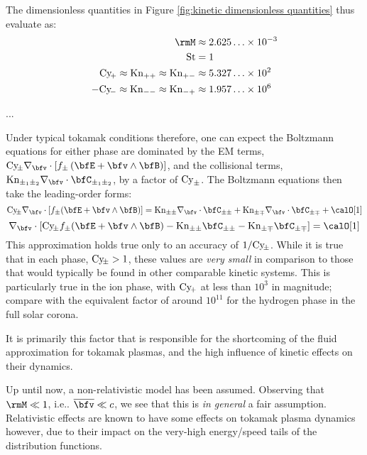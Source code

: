     The dimensionless quantities in Figure \ref{fig:kinetic dimensionless quantities} thus evaluate as:
    \begin{align}
                                                           \rmM  &\approx  2.625\ldots\times 10^{- 3}  \\
                                                          \rmSt  &=        1                           \\
          \rmCy\!_{+}  \approx  \rmKn_{++}  \approx  \rmKn_{+-}  &\approx  5.327\ldots\times 10^{2}    \\
        - \rmCy\!_{-}  \approx  \rmKn_{--}  \approx  \rmKn_{-+}  &\approx  1.957\ldots\times 10^{6}
    \end{align}

    ...

    Under typical tokamak conditions therefore, one can expect the Boltzmann equations for either phase are dominated by the EM terms, $\rmCy\!_{\pm}\nabla_{\bfv}\cdot[f_{\pm}\left(\bfE + \bfv\wedge\bfB\right)]$, and the collisional terms, $\rmKn_{\pm_{1}\pm_{2}}\nabla_{\bfv}\cdot\bfC_{\pm_{1}\pm_{2}}$, by a factor of $\mathrm{Cy}_{\pm}$. The Boltzmann equations then take the leading-order forms:
    \begin{equation}
        \rmCy\!_{\pm}\nabla_{\bfv}\cdot[f_{\pm}(\bfE + \bfv\wedge\bfB)]  =  \rmKn_{\pm\pm}\nabla_{\bfv}\cdot\bfC_{\pm\pm} + \rmKn_{\pm\mp}\nabla_{\bfv}\cdot\bfC_{\pm\mp} + \calO[1]
    \end{equation}
    \begin{equation}
        \nabla_{\bfv}\cdot[\rmCy\!_{\pm}f_{\pm}(\bfE + \bfv\wedge\bfB) - \rmKn_{\pm\pm}\bfC_{\pm\pm} - \rmKn_{\pm\mp}\bfC_{\pm\mp}]  =  \calO[1]  \label{eqn:leading-order Boltzmann equation}
    \end{equation}
    This approximation holds true only to an accuracy of $1/\mathrm{Cy}\!_{\pm}$. While it is true that in each phase, $\mathrm{Cy}\!_{\pm} > 1$, these values are \emph{very small} in comparison to those that would typically be found in other comparable kinetic systems. This is particularly true in the ion phase, with $\mathrm{Cy}\!_{+}$ at less than $10^{3}$ in magnitude; compare with the equivalent factor of around $10^{11}$ for the hydrogen phase in the full solar corona.

    It is primarily this factor that is responsible for the shortcoming of the fluid approximation for tokamak plasmas, and the high influence of kinetic effects on their dynamics.

    \begin{remark}
        Up until now, a non-relativistic model has been assumed. Observing that $\rmM  \ll  1$, i.e.. $\overline{\bfv}  \ll  c$, we see that this is \emph{in general} a fair assumption. Relativistic effects are known to have some effects on tokamak plasma dynamics however, due to their impact on the very-high energy/speed tails of the distribution functions. \BA{[Ref]}
    \end{remark}
    